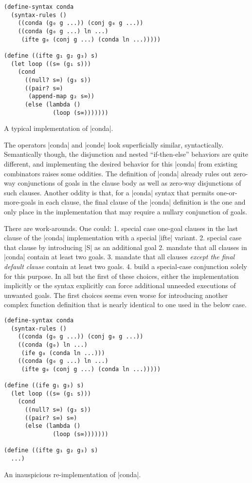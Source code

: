 \documentclass[sigplan,screen,draft,anonymous,review,natbib=false]{acmart}
\begin{document}
\begin{listing}
  \begin{verbatim}
(define-syntax conda
  (syntax-rules ()
    ((conda (g₀ g ...)) (conj g₀ g ...))
    ((conda (g₀ g ...) ln ...)
     (ifte g₀ (conj g ...) (conda ln ...)))))

(define ((ifte g₁ g₂ g₃) s)
  (let loop ((s∞ (g₁ s)))
    (cond
      ((null? s∞) (g₃ s))
      ((pair? s∞)
       (append-map g₂ s∞))
      (else (lambda ()
              (loop (s∞)))))))
  \end{verbatim}
  \caption{A typical implementation of \rackinline|conda|.}
  \label{mnt:conda-implementation}
\end{listing}

The operators \rackinline|conda| and \rackinline|conde| look
superficially similar, syntactically. Semantically though, the
disjunction and nested \enquote{if-then-else} behaviors are quite
different, and implementing the desired behavior for this
\rackinline|conda| from existing combinators raises some oddities. The
definition of \rackinline|conda| already rules out zero-way
conjunctions of goals in the clause body as well as zero-way
disjunctions of such clauses. Another oddity is that, for a
\rackinline|conda| syntax that permits one-or-more-goals in each
clause, the final clause of the \rackinline|conda| definition is the
one and only place in the implementation that may require a nullary
conjunction of goals.

There are work-arounds. One could: 1. special case one-goal clauses in
the last clause of the \rackinline|conda| implementation with a
special \rackinline|ifte| variant. 2. special case that clause by
introducing \rackinline|S| as an additional goal 2. mandate that all
clauses in \rackinline|conda| contain at least two goals. 3. mandate
that all clauses \emph{except the final default clause} contain at
least two goals. 4. build a special-case conjunction solely for this
purpose. In all but the first of these choices, either the
implementation implicitly or the syntax explicitly can force
additional unneeded executions of unwanted goals. The first choices
seems even worse for introducing another complex function definition
that is nearly identical to one used in the below case.

\begin{listing}
  \begin{verbatim}
(define-syntax conda
  (syntax-rules ()
    ((conda (g₀ g ...)) (conj g₀ g ...))
    ((conda (g₀) ln ...)
     (ife g₀ (conda ln ...)))
    ((conda (g₀ g ...) ln ...)
     (ifte g₀ (conj g ...) (conda ln ...)))))

(define ((ife g₁ g₃) s)
  (let loop ((s∞ (g₁ s)))
    (cond
      ((null? s∞) (g₃ s))
      ((pair? s∞) s∞)
      (else (lambda ()
              (loop (s∞)))))))

(define ((ifte g₁ g₂ g₃) s)
  ...)
  \end{verbatim}
  \caption{An inauspicious re-implementation of \rackinline|conda|.}
  \label{mnt:conda-bad-re-implementation}
\end{listing}
\end{document}
